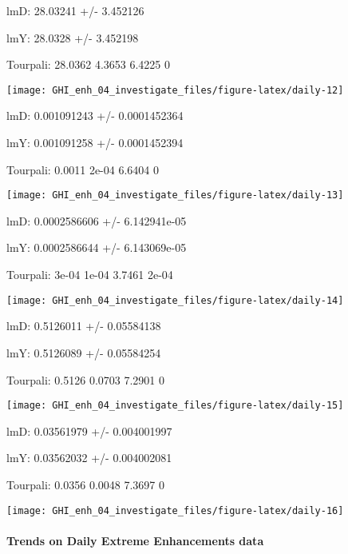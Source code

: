 \documentclass[
  10pt,
  a4paper,oneside]{article}
\begin{document}
lmD: 28.03241 +/- 3.452126

lmY: 28.0328 +/- 3.452198

Tourpali: 28.0362 4.3653 6.4225 0

\begin{center}\texttt{[image: GHI\_enh\_04\_investigate\_files/figure-latex/daily-12]} \end{center}

lmD: 0.001091243 +/- 0.0001452364

lmY: 0.001091258 +/- 0.0001452394

Tourpali: 0.0011 2e-04 6.6404 0

\begin{center}\texttt{[image: GHI\_enh\_04\_investigate\_files/figure-latex/daily-13]} \end{center}

lmD: 0.0002586606 +/- 6.142941e-05

lmY: 0.0002586644 +/- 6.143069e-05

Tourpali: 3e-04 1e-04 3.7461 2e-04

\begin{center}\texttt{[image: GHI\_enh\_04\_investigate\_files/figure-latex/daily-14]} \end{center}

lmD: 0.5126011 +/- 0.05584138

lmY: 0.5126089 +/- 0.05584254

Tourpali: 0.5126 0.0703 7.2901 0

\begin{center}\texttt{[image: GHI\_enh\_04\_investigate\_files/figure-latex/daily-15]} \end{center}

lmD: 0.03561979 +/- 0.004001997

lmY: 0.03562032 +/- 0.004002081

Tourpali: 0.0356 0.0048 7.3697 0

\begin{center}\texttt{[image: GHI\_enh\_04\_investigate\_files/figure-latex/daily-16]} \end{center}

\newpage

\hypertarget{trends-on-daily-extreme-enhancements-data}{%
\paragraph{Trends on Daily Extreme Enhancements data}\label{trends-on-daily-extreme-enhancements-data}}
\end{document}
